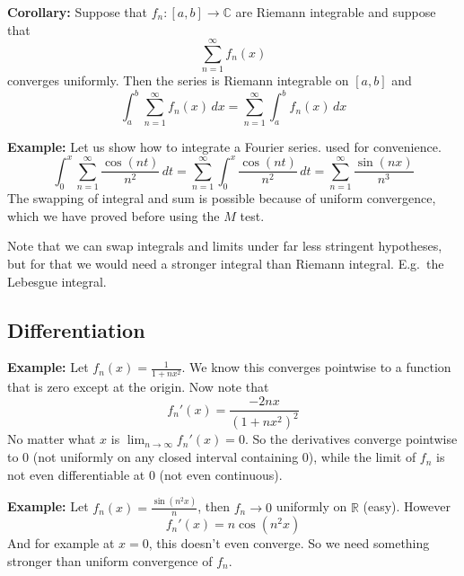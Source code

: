 \documentclass[12pt]{book}
\newcommand{\C}{{\mathbb{C}}}
\newcommand{\R}{{\mathbb{R}}}
\theoremstyle{plain}
\theoremstyle{remark}
\theoremstyle{definition}
\theoremstyle{exercise}
\theoremstyle{example}
\begin{document}
\textbf{Corollary:}
Suppose that $f_n \colon [a,b] \to \C$
are Riemann integrable and suppose that
\begin{equation*}
\sum_{n=1}^\infty f_n(x)
\end{equation*}
converges uniformly.  Then the series is Riemann integrable on $[a,b]$
and
\begin{equation*}
\int_a^b \sum_{n=1}^\infty f_n(x) \,dx
=
\sum_{n=1}^\infty \int_a^b f_n(x) \,dx
\end{equation*}

\medskip

\textbf{Example:}
Let us show how to integrate a Fourier series.
used for convenience.
\begin{equation*}
\int_{0}^x \sum_{n=1}^\infty \frac{\cos(nt)}{n^2} \,dt
=
\sum_{n=1}^\infty \int_{0}^x \frac{\cos(nt)}{n^2}\,dt
=
\sum_{n=1}^\infty \frac{\sin(nx)}{n^3}
\end{equation*}
The swapping of integral and sum is possible because of uniform convergence,
which we have proved before using the $M$ test.

\medskip

Note that we can swap integrals and limits under far less stringent hypotheses,
but for that we would need a stronger integral than Riemann integral.  E.g.\
the Lebesgue integral.

\subsection{Differentiation}

\textbf{Example:}
Let $f_n(x) = \frac{1}{1+nx^2}$.  We know this converges
pointwise to a function that is zero except at the origin.
Now note that
\begin{equation*}
f_n'(x) %
= \frac{-2 n x}{(1+ n x^2)^2}
\end{equation*}
No matter what $x$ is $\lim_{n\to\infty} f_n'(x) = 0$.  So the derivatives
converge pointwise to 0 (not uniformly on any closed interval containing 0),
while the limit of $f_n$ is not even differentiable at 0 (not even
continuous).

\medskip

\textbf{Example:}
Let $f_n(x) = \frac{\sin(n^2x)}{n}$, then
$f_n \to 0$ uniformly on $\R$ (easy).  However
\begin{equation*}
f_n'(x) = n\cos(n^2x)
\end{equation*}
And for example at $x=0$, this doesn't even converge.  So we need something
stronger than uniform convergence of $f_n$.
\end{document}
